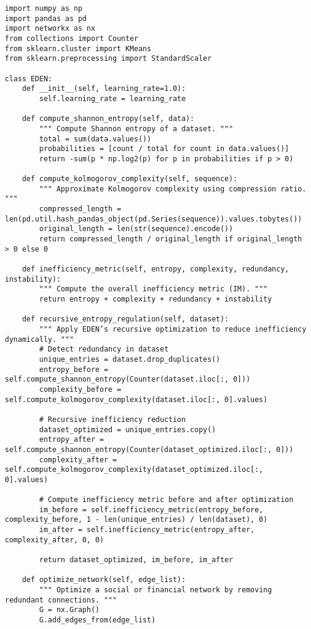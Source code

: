 \documentclass{article}
\begin{document}
\begin{verbatim}
import numpy as np
import pandas as pd
import networkx as nx
from collections import Counter
from sklearn.cluster import KMeans
from sklearn.preprocessing import StandardScaler

class EDEN:
    def __init__(self, learning_rate=1.0):
        self.learning_rate = learning_rate

    def compute_shannon_entropy(self, data):
        """ Compute Shannon entropy of a dataset. """
        total = sum(data.values())
        probabilities = [count / total for count in data.values()]
        return -sum(p * np.log2(p) for p in probabilities if p > 0)

    def compute_kolmogorov_complexity(self, sequence):
        """ Approximate Kolmogorov complexity using compression ratio. """
        compressed_length = len(pd.util.hash_pandas_object(pd.Series(sequence)).values.tobytes())
        original_length = len(str(sequence).encode())
        return compressed_length / original_length if original_length > 0 else 0

    def inefficiency_metric(self, entropy, complexity, redundancy, instability):
        """ Compute the overall inefficiency metric (IM). """
        return entropy + complexity + redundancy + instability

    def recursive_entropy_regulation(self, dataset):
        """ Apply EDEN’s recursive optimization to reduce inefficiency dynamically. """
        # Detect redundancy in dataset
        unique_entries = dataset.drop_duplicates()
        entropy_before = self.compute_shannon_entropy(Counter(dataset.iloc[:, 0]))
        complexity_before = self.compute_kolmogorov_complexity(dataset.iloc[:, 0].values)

        # Recursive inefficiency reduction
        dataset_optimized = unique_entries.copy()
        entropy_after = self.compute_shannon_entropy(Counter(dataset_optimized.iloc[:, 0]))
        complexity_after = self.compute_kolmogorov_complexity(dataset_optimized.iloc[:, 0].values)

        # Compute inefficiency metric before and after optimization
        im_before = self.inefficiency_metric(entropy_before, complexity_before, 1 - len(unique_entries) / len(dataset), 0)
        im_after = self.inefficiency_metric(entropy_after, complexity_after, 0, 0)

        return dataset_optimized, im_before, im_after

    def optimize_network(self, edge_list):
        """ Optimize a social or financial network by removing redundant connections. """
        G = nx.Graph()
        G.add_edges_from(edge_list)


\end{verbatim}
\end{document}
